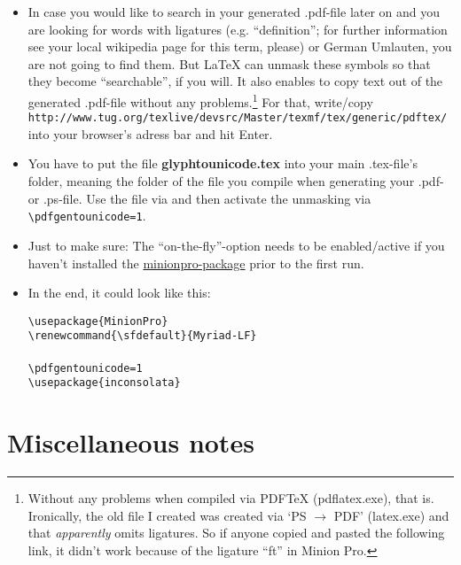 \begin{itemize}\setlength{\itemsep}{-2pt}
	\item In case you would like to search in your generated .pdf-file later on and you are looking for words with ligatures (e.g. ``definition''; for further information see your local wikipedia page for this term, please) or German Umlauten, you are not going to find them. But \LaTeX{} can unmask these symbols so that they become ``searchable'', if you will. It also enables to copy text out of the generated .pdf-file without any problems.\footnote{Without any problems when compiled via PDF\TeX{} (pdflatex.exe), that is. Ironically, the old file I created was created via `PS $\rightarrow$ PDF' (latex.exe) and that \emph{apparently} omits ligatures. So if anyone copied and pasted the following link, it didn't work because of the ligature ``ft'' in Minion Pro.} For that, write/copy\\
	\verb+http://www.tug.org/texlive/devsrc/Master/texmf/tex/generic/pdftex/+\\
	into your browser's adress bar and hit Enter.

	\item You have to put the file \textbf{glyphtounicode.tex} into your main .tex-file's folder, meaning the folder of the file you compile when generating your .pdf- or .ps-file. Use the file via \verb++ and then activate the unmasking via \verb+\pdfgentounicode=1+.
	\item Just to make sure: The ``on-the-fly''-option needs to be enabled/active if you haven't installed the \href{http://ctan.org/pkg/minionpro}{minionpro-package} prior to the first run.
	\item In the end, it could look like this:
	\begin{center}\begin{minipage}[t]{8cm}
	\begin{flushleft}
	\verb+\usepackage{MinionPro}+\\
	\verb+\renewcommand{\sfdefault}{Myriad-LF}+\\
	\verb++\\
	\verb+\pdfgentounicode=1+\\
	\verb+\usepackage{inconsolata}+
	\end{flushleft}
	\end{minipage}\end{center}
\end{itemize}

\section{Miscellaneous notes}

